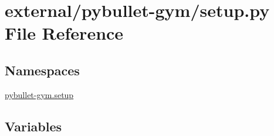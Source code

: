 \hypertarget{external_2pybullet-gym_2setup_8py}{}\section{external/pybullet-\/gym/setup.py File Reference}
\label{external_2pybullet-gym_2setup_8py}
\subsection*{Namespaces}
\begin{DoxyCompactItemize}
\item 
 \hyperlink{namespacepybullet-gym_1_1setup}{pybullet-\/gym.\+setup}
\end{DoxyCompactItemize}
\subsection*{Variables}
